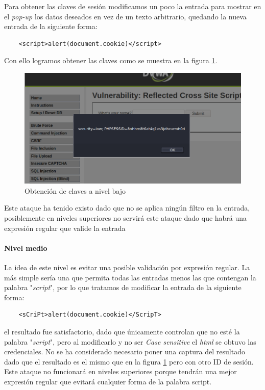 Para obtener las claves de sesión modificamos un poco la entrada para mostrar en el {\it pop-up}
los datos deseados en vez de un texto arbitrario, quedando la nueva entrada de la siguiente forma:
\begin{lstlisting}
    <script>alert(document.cookie)</script>
\end{lstlisting}
Con ello logramos obtener las claves como se muestra en la figura \ref{fig:low}. 
\begin{figure}[ht!]
    \centering
    \includegraphics[width=14cm]{img/xss/low.png}
    \caption{Obtención de claves a nivel bajo}
    \label{fig:low}
\end{figure}
Este ataque ha tenido existo dado que no se aplica ningún filtro  en la entrada,
posiblemente en niveles superiores no servirá este ataque dado que habrá una expresión regular
que valide la entrada

\paragraph{Nivel medio} La idea de este nivel es evitar una posible validación por expresión regular. 
La más simple sería una que permita todas las entradas menos las que contengan la palabra "{\it script}", por
lo que tratamos de modificar la entrada de la siguiente forma:
\begin{lstlisting}
    <sCriPt>alert(document.cookie)</ScripT>
\end{lstlisting}
el resultado fue satisfactorio, dado que únicamente controlan que no esté la palabra "{\it script}", pero 
al modificarlo y no ser {\it Case sensitive} el {\it html} se obtuvo las credenciales. No se ha considerado necesario 
poner una captura del resultado dado que el resultado es el mismo que en la figura \ref{fig:low} pero con otro
ID de sesión. Este ataque no funcionará en niveles superiores porque tendrán una mejor expresión regular
que evitará cualquier forma de la palabra script.

